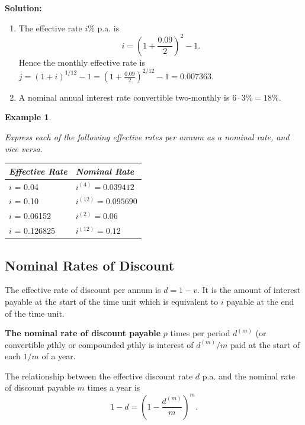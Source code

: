 \documentclass[
]{book}
\theoremstyle{definition}
\theoremstyle{definition}
\newtheorem{example}{Example}[chapter]
\theoremstyle{definition}
\theoremstyle{definition}
\theoremstyle{remark}
\begin{document}
\textbf{Solution:}

\begin{enumerate}
\def\labelenumi{\arabic{enumi}.}
\item
  The effective rate \(i\)\% p.a. is \[i = ( 1 + \frac{0.09}{2})^2 - 1.\]
  Hence the monthly effective rate is
  \(j = (1 + i)^{1/12} - 1 = ( 1 + \frac{0.09}{2})^{2/12} - 1 = 0.007363\).
\item
  A nominal annual interest rate convertible two-monthly is
  \(6 \cdot 3\% = 18\%\).
\end{enumerate}

\begin{example}
\protect\hypertarget{exm:unlabeled-div-42}{}\label{exm:unlabeled-div-42}

\emph{Express each of the following effective rates per annum as a nominal
rate, and vice versa.}

\begin{longtable}[]{@{}ll@{}}
\toprule
\textbf{\emph{Effective Rate}} & \textbf{\emph{Nominal Rate}} \\
\midrule
\endhead
\(i\) = 0.04 & \(i^{(4)} = 0.039412\) \\
\(i\) = 0.10 & \(i^{(12)} = 0.095690\) \\
\(i\) = 0.06152 & \(i^{(2)} = 0.06\) \\
\(i\) = 0.126825 & \(i^{(12)} = 0.12\) \\
\bottomrule
\end{longtable}

\end{example}

\hypertarget{nominal-rates-of-discount}{%
\subsection{Nominal Rates of Discount}\label{nominal-rates-of-discount}}

The effective rate of discount per annum is \(d = 1 -v\). It is the amount
of interest payable at the start of the time unit which is equivalent to
\(i\) payable at the end of the time unit.

\textbf{The nominal rate of discount payable} \(p\) times per period \(d^{(m)}\)
(or convertible \(p\)thly or compounded \(p\)thly is interest of \(d^{(m)}/m\)
paid at the start of each \(1/m\) of a year.

The relationship between the effective discount rate \(d\) p.a. and the
nominal rate of discount payable \(m\) times a year is
\[1 - d = \left(1 - \frac{d^{(m)}}{m}\right)^m.\]
\end{document}
